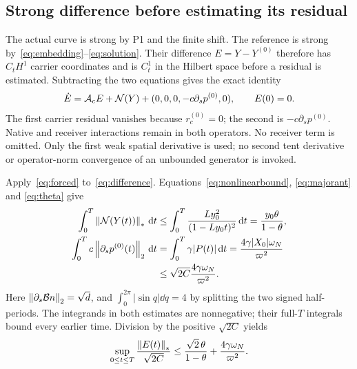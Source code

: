 \subsection{Strong difference before estimating its residual}\label{sec:difference}
The actual curve is strong by P1 and the finite shift. The reference is strong by~\eqref{eq:embedding}--\eqref{eq:solution}. Their difference $E=Y-Y^{(0)}$ therefore has $C_tH^1$ carrier coordinates and is $C^1_t$ in the Hilbert space before a residual is estimated. Subtracting the two equations gives the exact identity
\begin{equation}\label{eq:difference}%
 \dot E=\Ac E+\mathcal N(Y)
       +(0,0,0,-c\partial_sp^{(0)},0),\qquad E(0)=0 .
\end{equation}
The first carrier residual vanishes because $r_c^{(0)}=0$; the second is
$-c\partial_sp^{(0)}$. Native and receiver interactions remain in both operators. No receiver term is omitted. Only the first weak spatial derivative is used; no second tent derivative or operator-norm convergence of an unbounded generator is invoked.

Apply~\eqref{eq:forced} to~\eqref{eq:difference}. Equations~\eqref{eq:nonlinearbound}, \eqref{eq:majorant} and \eqref{eq:theta} give
\begin{equation}\label{eq:integrals}%
\begin{aligned}
 \int_0^T\norm{\mathcal N(Y(t))}_*\dd t
 &\le\int_0^T\frac{Ly_0^2}{(1-Ly_0t)^2}\dd t
 =\frac{y_0\theta}{1-\theta},\\
 \int_0^T c\norm{\partial_sp^{(0)}(t)}_2\dd t
 &=\int_0^T\gamma|P(t)|\dd t
 =\frac{4\gamma|X_0|\omega_N}{\varpi^2}\\
 &\le\sqrt{2C}\frac{4\gamma\omega_N}{\varpi^2}.
\end{aligned}
\end{equation}
Here $\left\|\partial_s\mathcal B n\right\|_2=\sqrt d$, and
$\int_0^{2\pi}|\sin q|\dd q=4$ by splitting the two signed half-periods. The integrands in both estimates are nonnegative; their full-$T$ integrals bound every earlier time. Division by the positive $\sqrt{2C}$ yields
\begin{equation}\label{eq:errorbound}%
 \sup_{0\le t\le T}\frac{\norm{E(t)}_*}{\sqrt{2C}}
 \le\frac{\sqrt2\,\theta}{1-\theta}
      +\frac{4\gamma\omega_N}{\varpi^2}.
\end{equation}

